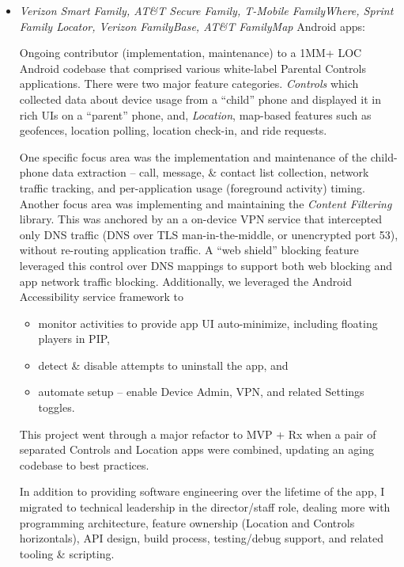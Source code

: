 	   \begin{itemize}
		\item 
		{\em Verizon Smart Family,
		AT\&T Secure Family, 
		T-Mobile FamilyWhere,
		Sprint Family Locator,
		Verizon FamilyBase,
		AT\&T FamilyMap} Android apps: 
		
		Ongoing contributor (implementation, maintenance) to a 1MM+ LOC Android codebase that comprised
		various white-label Parental Controls applications. There were two major feature 
		categories.  {\it Controls} which collected data about device usage from a ``child'' phone and displayed it
		in rich UIs on a ``parent'' phone, and, {\it Location}, map-based features such as geofences, location polling, 
		location check-in, and ride requests.
		
		One specific focus area was the implementation and maintenance of the child-phone data extraction -- 
		call, message, \& contact list collection, 
		network traffic tracking, and
		per-application usage (foreground activity) timing.  
		Another focus area was implementing and maintaining the {\it Content Filtering} library.  
		This was anchored by an a on-device VPN service that intercepted only
		DNS traffic (DNS over TLS man-in-the-middle, or unencrypted port 53), without re-routing application traffic.
		A ``web shield'' blocking feature leveraged
		this control over DNS mappings to support both web blocking and app network traffic blocking.  Additionally,
		we leveraged the Android Accessibility service framework to 
		\begin{itemize}
		\item monitor activities to provide app UI auto-minimize, including floating players in PIP,
		\item detect \& disable attempts to uninstall the app, and
		\item automate setup -- enable Device Admin, VPN, and related Settings toggles.
		\end{itemize}
		
		This project went through a major refactor to MVP + Rx when a pair of separated Controls and Location
		apps were combined, updating an aging codebase to best practices.  
		
		In addition to providing software engineering over the lifetime of the app, 
		I migrated to technical leadership in the director/staff role, dealing more with
		programming architecture, 
		feature ownership (Location and Controls horizontals), API design,
		build process, testing/debug support, and related tooling \& scripting.  
		\\[-16pt]
		

\end{itemize}
